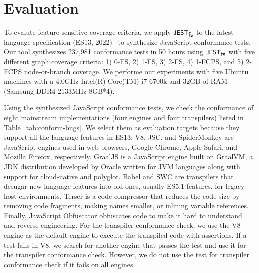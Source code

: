 \section{Evaluation}\label{sec:eval}

To evalute feature-sensitive coverage criteria, we apply $\textsf{\small JEST}_{\textsf{\small fs}}$ to the latest
language specification (ES13, 2022)~\cite{es13} to synthesize JavaScript
conformance tests.
%
Our tool synthesizes 237,981 conformance tests in 50 hours using $\textsf{\small JEST}_{\textsf{\small fs}}$ with
five different graph coverage criteria: 1) 0-FS, 2) 1-FS, 3) 2-FS, 4) 1-FCPS,
and 5) 2-FCPS node-or-branch coverage.
%
We performe our experiments with five Ubuntu machines with a 4.0GHz Intel(R)
Core(TM) i7-6700k and 32GB of RAM (Samsung DDR4 2133MHz 8GB*4).


Using the synthesized JavaScript conformance tests, we check the conformance of
eight mainstream implementations (four engines and four transpilers) listed in
Table~\ref{tab:conform-bugs}.
%
We select them as evaluation targets because they support all the language
features in ES13;
%
V8, JSC, and SpiderMonkey are JavaScript engines used in web browsers, Google
Chrome, Apple Safari, and Mozilla Firefox, respectively.
%
GraalJS is a JavaScript engine built on GraalVM, a JDK distribution developed by
Oracle written for JVM languages along with support for cloud-native and
polyglot.
%
Babel and SWC are transpilers that desugar new language features into old ones,
usually ES5.1 features, for legacy host environments.
%
Terser is a code compressor that reduces the code size by removing code
fragments, making names smaller, or inlining variable references.
%
Finally, JavaScript Obfuscator obfuscates code to make it hard to understand and
reverse-engineering.
%
For the transpiler conformance check, we use the V8 engine as the default engine
to execute the transpiled code with assertions.
%
If a test fails in V8, we search for another engine that passes the test and use
it for the transpiler conformance check.
%
However, we do not use the test for transpiler conformance check if it fails on
all engines.


